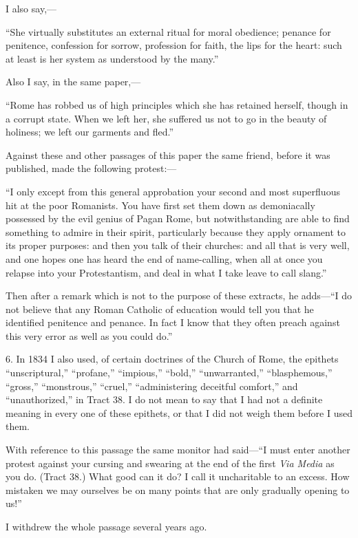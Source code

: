 I also say,—

``She virtually substitutes an external ritual
for moral obedience; penance for penitence, confession for sorrow,
profession for faith, the lips for the heart: such at least is her
system as understood by the many.''

Also I say, in the same paper,—

``Rome has robbed us of high principles which
she has retained herself, though in a corrupt state. When we left her,
she suffered us not to go in the beauty of holiness; we left our
garments and fled.''

Against these and other passages of this paper the
same friend, before it was published, made the following protest:—

``I only except from this general approbation
your second and most superfluous hit at the poor Romanists. You have
first set them down as demoniacally possessed by the evil genius
of Pagan Rome, but notwithstanding are able to find something to
admire in their spirit, particularly because they apply ornament to
its proper purposes: and then you talk of their churches: and all that
is very well, and one hopes one has heard the end of name-calling,
when all at once you relapse into your Protestantism, and deal in what
I take leave to call slang.''

Then after a remark which is not to the purpose of
these extracts, he adds—``I do not believe that any Roman
Catholic of education would tell you that he identified penitence and
penance. In fact I know that they often preach against this very error
as well as you could do.''

6. In 1834 I also used, of certain doctrines of the
Church of Rome, the epithets ``unscriptural,''
``profane,'' ``impious,'' ``bold,''
``unwarranted,'' ``blasphemous,'' ``gross,''
``monstrous,'' ``cruel,'' ``administering
deceitful comfort,'' and ``unauthorized,'' in Tract 38. I
do not mean to say that I had not a definite meaning in every one of
these epithets, or that I did not weigh them before I used them.

With reference to this passage the same monitor had
said—``I must enter another protest against your cursing and
swearing at the end of the first \emph{Via Media} as you do. (Tract 38.) What
good can it do? I call it uncharitable to an excess. How mistaken we
may ourselves be on many points that are only gradually opening to
us!''

I withdrew the whole passage several years ago.

